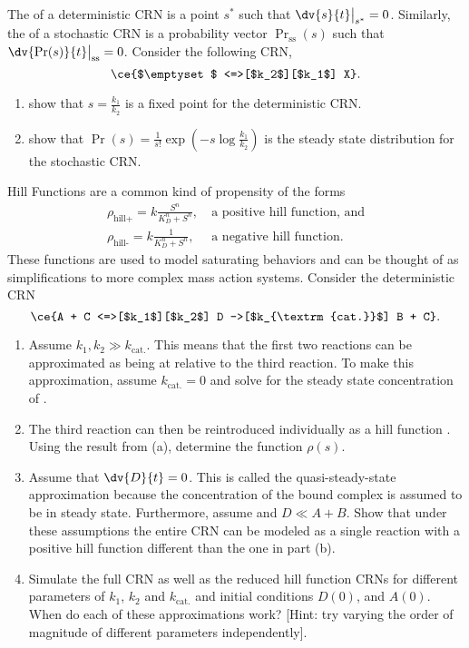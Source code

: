 \begin{problem}[quantitative]
  The  of a deterministic CRN is a point $s^*$ such that $\dv{s}{t}\big|_{s^*} = 0$.
  Similarly, the  of a stochastic CRN is a probability vector $\Pr_{\mathrm{ss}}(s)$ such that
  $\dv{\Pr(s)}{t}\big|_{\mathrm{ss}}= 0$.
  Consider the following CRN, 
  \[ \ce{$\emptyset$ <=>[$k_2$][$k_1$] X}. \]
  \begin{enumerate}[label=\alph*.]
    \item show that $s = \frac{k_1}{k_2}$ is a fixed point for the deterministic CRN.
    \item show that $\Pr(s) = \frac{1}{s!} \exp(-s \log \frac{k_1}{k_2})$ is the steady state distribution for the stochastic CRN.
  \end{enumerate}
\end{problem}

\begin{problem}[quantitative,label=prob:crn:hill-fn]
  Hill Functions are a common kind of propensity of the forms
  \begin{align*}
    \rho_{\textrm{hill+}} = k \frac{S^n}{K_D^n + S^n}, &~ \textrm{a positive hill function, and} \\
    \rho_{\textrm{hill-}} = k \frac{1}{K_D^n + S^n}, &~ \textrm{a negative hill function}.
  \end{align*}
  These functions are used to model saturating behaviors and can be thought of as simplifications to more complex mass action systems.
  Consider the deterministic CRN
  \[ \ce{A + C <=>[$k_1$][$k_2$] D ->[$k_{\textrm{cat.}}$] B + C}. \]
  \begin{enumerate}[label=\alph*.]
    \item Assume $k_1, k_2 \gg k_{\text{cat.}}$.
    This means that the first two reactions can be approximated as being at  relative to the third reaction.
    To make this approximation, assume $k_{\textrm{cat.}} = 0$ and solve for the steady state concentration of .
    \item The third reaction can then be reintroduced individually as a hill function .
    Using the result from (a), determine the function $\rho(s)$.
    \item Assume that $\dv{D}{t} = 0$. This is called the quasi-steady-state approximation because the concentration of the bound complex  is assumed to be in steady state. Furthermore, assume and $D \ll A+B$. Show that under these assumptions the entire CRN can be modeled as a single reaction  with a positive hill function different than the one in part (b).
    \item Simulate the full CRN as well as the reduced hill function CRNs for different parameters of $k_1$, $k_2$ and $k_{\textrm{cat.}}$ and initial conditions $D(0)$, and $A(0)$. When do each of these approximations work? [Hint: try varying the order of magnitude of different parameters independently].
  \end{enumerate}
\end{problem}

